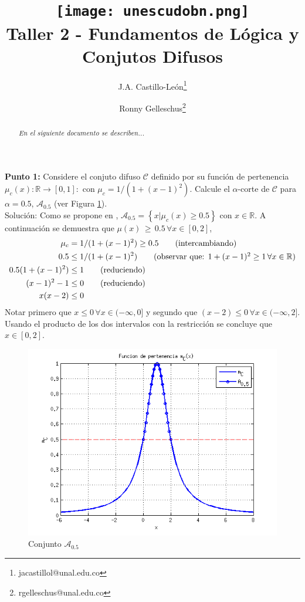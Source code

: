 \documentclass[10pt,onecolumn,twoside,letterpaper]{article}
\title{\vspace{-0.8cm}\texttt{[image: unescudobn.png]}\\\vspace{-0.0cm}
  \LARGE \textbf{Taller 2 - Fundamentos de L\'ogica y Conjutos Difusos}}
\author{J.A. Castillo-Le\'on\thanks{jacastillol@unal.edu.co} \and Ronny Gelleschus\thanks{rgelleschus@unal.edu.co}}
\date{}
\begin{document}
\maketitle
\begin{abstract}\noindent\small\textit{En el siguiente documento se describen...}
\end{abstract}\vspace{1cm}


\par{\bf \large Punto 1:} Considere el conjuto difuso $\mathcal{C}$ definido por su funci\'on de pertenencia $\mu_c(x):\mathbb{R}\to[0,1]:$ con $\mu_c=1/(1+(x-1)^2)$. Calcule el $\alpha$-corte de $\mathcal{C}$ para $\alpha=0.5$, $\mathcal{A}_{0.5}$ (ver Figura \ref{fig:Acut05}).\\
Soluci\'on: Como se propone en \cite{Babuska1999}, $\mathcal{A}_{0.5}=\left\{x|\mu_c(x)\geq0.5\right\}$ con $x\in\mathbb{R}$. A continuaci\'on se demuestra que $\mu(x)\,\geq\,0.5\,\forall x \in [0,2]$,
\begin{align*}\small
  \mu_c&=1/(1+(x-1)^2)\geq 0.5 \tag{intercambiando}
  \\0.5&\leq 1/(1+(x-1)^2) \tag{observar que: $1+(x-1)^2\geq 1\,\forall x\in\mathbb{R}$}
  \\0.5(1+(x-1)^2)&\leq 1 \tag{reduciendo}
  \\(x-1)^2-1&\leq 0 \tag{reduciendo}
  \\x(x-2)&\leq 0 
\end{align*}
Notar primero que $x\leq 0\,\forall x\in(-\infty,0]$ y segundo que $(x-2)\leq0\,\forall x\in(-\infty,2]$. Usando el producto de los dos intervalos con la restricci\'on se concluye que $x\in [0,2]$.
\begin{figure}[H]
 \centering
 \includegraphics[scale=0.6]{A_05.png}
 \caption{Conjunto $\mathcal{A}_{0.5}$}
 \label{fig:Acut05}
\end{figure}
\end{document}
